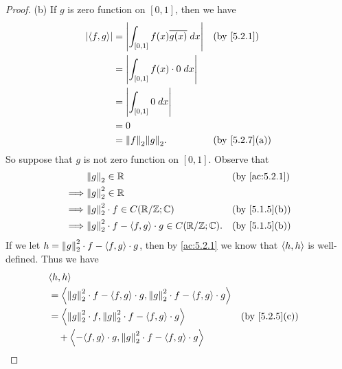 \begin{proof}{(b)}
  If \(g\) is zero function on \([0, 1]\), then we have
  \begin{align*}
    \abs{\inner*{f, g}} & = \abs{\int_{[0, 1]} f(x) \overline{g(x)} \; dx} &  & \by{5.2.1}                  \\
                        & = \abs{\int_{[0, 1]} f(x) \cdot 0 \; dx}                                          \\
                        & = \abs{\int_{[0, 1]} 0 \; dx}                                                     \\
                        & = 0                                                                               \\
                        & = \norm*{f}_2 \norm*{g}_2.                       &  & \text{(by \cref{5.2.7}(a))}
  \end{align*}
  So suppose that \(g\) is not zero function on \([0, 1]\).
  Observe that
  \begin{align*}
             & \norm*{g}_2 \in \R                                                 &  & \by{ac:5.2.1}               \\
    \implies & \norm*{g}_2^2 \in \R                                                                                \\
    \implies & \norm*{g}_2^2 \cdot f \in C(\R / \Z ; \C)                          &  & \text{(by \cref{5.1.5}(b))} \\
    \implies & \norm*{g}_2^2 \cdot f - \inner*{f, g} \cdot g \in C(\R / \Z ; \C). &  & \text{(by \cref{5.1.5}(b))}
  \end{align*}
  If we let \(h = \norm*{g}_2^2 \cdot f - \inner*{f, g} \cdot g\), then by \cref{ac:5.2.1} we know that \(\inner*{h, h}\) is well-defined.
  Thus we have
  \begin{align*}
     & \inner*{h, h}                                                                                                                                             \\
     & = \inner*{\norm*{g}_2^2 \cdot f - \inner*{f, g} \cdot g, \norm*{g}_2^2 \cdot f - \inner*{f, g} \cdot g}                                                   \\
     & = \inner*{\norm*{g}_2^2 \cdot f, \norm*{g}_2^2 \cdot f - \inner*{f, g} \cdot g}                                          &  & \text{(by \cref{5.2.5}(c))} \\
     & \quad + \inner*{-\inner*{f, g} \cdot g, \norm*{g}_2^2 \cdot f - \inner*{f, g} \cdot g}                                                                    \\

\end{align*}
\end{proof}
